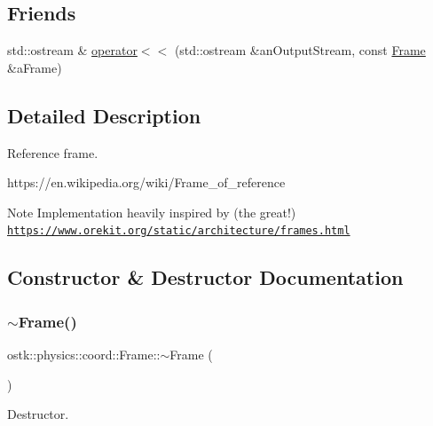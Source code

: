 \subsection*{Friends}
\begin{DoxyCompactItemize}
\item 
std\+::ostream \& \hyperlink{classostk_1_1physics_1_1coord_1_1_frame_a509ac1926cfc3553748bace204e2b1cc}{operator$<$$<$} (std\+::ostream \&an\+Output\+Stream, const \hyperlink{classostk_1_1physics_1_1coord_1_1_frame}{Frame} \&a\+Frame)
\end{DoxyCompactItemize}


\subsection{Detailed Description}
Reference frame. 

https\+://en.wikipedia.\+org/wiki/\+Frame\+\_\+of\+\_\+reference \begin{DoxyNote}{Note}
Implementation heavily inspired by (the great!) \href{https://www.orekit.org/static/architecture/frames.html}{\tt https\+://www.\+orekit.\+org/static/architecture/frames.\+html} 
\end{DoxyNote}


\subsection{Constructor \& Destructor Documentation}
\mbox{\label{classostk_1_1physics_1_1coord_1_1_frame_a9c8b5b7869ee8e730e0b23be60920a9d}} 
\subsubsection{\texorpdfstring{$\sim$\+Frame()}{~Frame()}}
{\footnotesize\ttfamily ostk\+::physics\+::coord\+::\+Frame\+::$\sim$\+Frame (\begin{DoxyParamCaption}{ }\end{DoxyParamCaption})}



Destructor. 

\mbox{\label{classostk_1_1physics_1_1coord_1_1_frame_a66f32d0c9dd2497b6e7ace4fcccbce60}} 
